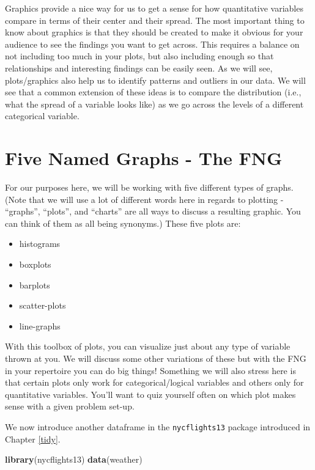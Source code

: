 \documentclass[]{tufte-book}
\newenvironment{Shaded}{\begin{snugshade}}{\end{snugshade}}
\newcommand{\KeywordTok}[1]{\textcolor[rgb]{0.13,0.29,0.53}{\textbf{{#1}}}}
\newcommand{\NormalTok}[1]{{#1}}
\providecommand{\tightlist}{%
  \setlength{\itemsep}{0pt}\setlength{\parskip}{0pt}}
\begin{document}
Graphics provide a nice way for us to get a sense for how quantitative
variables compare in terms of their center and their spread. The most
important thing to know about graphics is that they should be created to
make it obvious for your audience to see the findings you want to get
across. This requires a balance on not including too much in your plots,
but also including enough so that relationships and interesting findings
can be easily seen. As we will see, plots/graphics also help us to
identify patterns and outliers in our data. We will see that a common
extension of these ideas is to compare the distribution (i.e., what the
spread of a variable looks like) as we go across the levels of a
different categorical variable.

\section{Five Named Graphs - The FNG}\label{five-named-graphs---the-fng}

For our purposes here, we will be working with five different types of
graphs. (Note that we will use a lot of different words here in regards
to plotting - ``graphs'', ``plots'', and ``charts'' are all ways to
discuss a resulting graphic. You can think of them as all being
synonyms.) These five plots are:

\begin{itemize}
\tightlist
\item
  histograms
\item
  boxplots
\item
  barplots
\item
  scatter-plots
\item
  line-graphs
\end{itemize}

With this toolbox of plots, you can visualize just about any type of
variable thrown at you. We will discuss some other variations of these
but with the FNG in your repertoire you can do big things! Something we
will also stress here is that certain plots only work for
categorical/logical variables and others only for quantitative
variables. You'll want to quiz yourself often on which plot makes sense
with a given problem set-up.

We now introduce another dataframe in the \texttt{nycflights13} package
introduced in Chapter \ref{tidy}.

\begin{Shaded}
\begin{Highlighting}[]
\KeywordTok{library}\NormalTok{(nycflights13)}
\KeywordTok{data}\NormalTok{(weather)}
\end{Highlighting}
\end{Shaded}
\end{document}
